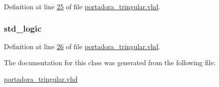 Definition at line \hyperlink{portadora__tringular_8vhd_source_l00025}{25} of file \hyperlink{portadora__tringular_8vhd_source}{portadora\+\_\+tringular.\+vhd}.

\hypertarget{classportadora__tringular_1_1portadora__tringular_ae27566c74fe97a2b3c215e94dc35dd47}{}
\subsubsection[{dir\+\_\+int}]{ {\bfseries \textcolor{comment}{std\+\_\+logic}\textcolor{vhdlchar}{ }} \hspace{0.3cm}{\ttfamily [Signal]}}\label{classportadora__tringular_1_1portadora__tringular_ae27566c74fe97a2b3c215e94dc35dd47}


Definition at line \hyperlink{portadora__tringular_8vhd_source_l00026}{26} of file \hyperlink{portadora__tringular_8vhd_source}{portadora\+\_\+tringular.\+vhd}.



The documentation for this class was generated from the following file\+:\begin{DoxyCompactItemize}
\item 
\hyperlink{portadora__tringular_8vhd}{portadora\+\_\+tringular.\+vhd}\end{DoxyCompactItemize}
